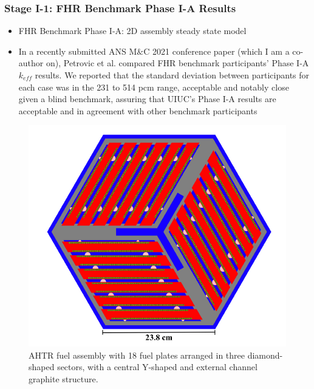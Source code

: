 \begin{frame}
    \frametitle{Stage I-1: FHR Benchmark Phase I-A Results}
    \begin{itemize}
        \item FHR Benchmark Phase I-A: 2D assembly steady state model
        \item In a recently submitted ANS M$\&$C 2021 conference paper 
        (which I am a co-author on), 
        Petrovic et al. \cite{petrovic_preliminary_2021} compared FHR benchmark 
        participants' Phase I-A $k_{eff}$ results.  
        We reported that the standard deviation between participants for each case 
        was in the 231 to 514 pcm range, acceptable and notably close given a blind 
        benchmark, assuring that \gls{UIUC}'s Phase I-A results are acceptable and 
        in agreement with other benchmark participants 
    \end{itemize}
    \begin{figure}[]
        \begin{minipage}[c]{0.5\textwidth}
        \centering
        \includegraphics[width=0.75\linewidth]{figures/ahtr-assembly.png} 
        \end{minipage}\hfill
        \begin{minipage}[c]{0.5\textwidth}
        \caption{\acrfull{AHTR} fuel assembly with 18 fuel plates arranged in 
        three diamond-shaped sectors, with a central Y-shaped and external channel 
        graphite structure.}
        \end{minipage}
    \end{figure}
\end{frame}

